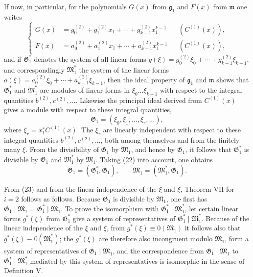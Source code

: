 \documentclass[11pt]{article}
\providecommand{\Gmod}{\mathfrak G}
\providecommand{\Mmod}{\mathfrak M}
\providecommand{\mideal}{\mathfrak m}
\providecommand{\gideal}{\mathfrak g}
\begin{document}
If now, in particular, for the polynomials $G(x)$ from $\gideal_1$ and $F(x)$ from $\mideal$ one writes
\begin{equation}
 \left\{\begin{aligned}
 G(x)&=g^{(2)}_0+g^{(2)}_1x_1+\cdots+g^{(2)}_{k-1}x_1^{k-1} &&(C^{(1)}(x)),\\
 F(x)&=a^{(2)}_0+a^{(2)}_1x_1+\cdots+a^{(2)}_{k-1}x_1^{k-1} &&(C^{(1)}(x)),
 \end{aligned}\right.
\tag{22}
\end{equation}
and if $\Gmod^*_1$ denotes the system of all linear forms $g(\xi)=g^{(2)}_0\xi_0+\cdots+g^{(2)}_{k-1}\xi_{k-1}$, and correspondingly $\Mmod^*_1$ the system of the linear forms $a(\xi)=a^{(2)}_0\xi_0+\cdots+a^{(2)}_{k-1}\xi_{k-1}$, then the ideal property of $\gideal_1$ and $\mideal$ shows that $\Gmod^*_1$ and $\Mmod^*_1$ are modules of linear forms in $\xi_0\ldots\xi_{k-1}$ with respect to the integral quantities $b^{(2)},c^{(2)},\ldots$. Likewise the principal ideal derived from $C^{(1)}(x)$ gives a module with respect to these integral quantities,
\[
 \Gmod_1=(\xi_0,\xi_1,\ldots,\xi_r,\ldots),
\]
where $\xi_r=x_1^rC^{(1)}(x)$. The $\xi_r$ are linearly independent with respect to these integral quantities $b^{(2)},c^{(2)},\ldots$, both among themselves and from the finitely many $\xi$. From the divisibility of $\Gmod_1$ by $\Mmod_1$, and hence by $\Gmod_1$, it follows that $\Gmod^*_1$ is divisible by $\Gmod_1$ and $\Mmod^*_1$ by $\Mmod_1$. Taking (22) into account, one obtains
\begin{equation}
 \Gmod_1=(\Gmod^*_1,\Gmod_1),\qquad
 \Mmod_1=(\Mmod^*_1,\Gmod_1).
\tag{23}
\end{equation}

From (23) and from the linear independence of the $\xi$ and $\xi$, Theorem VII for $i=2$ follows as follows. Because $\Gmod_1$ is divisible by $\Mmod_1$, one first has $\Gmod_1\mid\Mmod_1=\Gmod^*_1\mid\Mmod_1$. To prove the isomorphism with $\Gmod^*_1\mid\Mmod^*_1$, let certain linear forms $g^*(\xi)$ from $\Gmod^*_1$ give a system of representatives of $\Gmod^*_1\mid\Mmod^*_1$. Because of the linear independence of the $\xi$ and $\xi$, from $g^*(\xi)\equiv0(\Mmod_1)$ it follows also that $g^*(\xi)\equiv0(\Mmod^*_1)$; the $g^*(\xi)$ are therefore also incongruent modulo $\Mmod_1$, form a system of representatives of $\Gmod_1\mid\Mmod_1$, and the correspondence from $\Gmod_1\mid\Mmod_1$ to $\Gmod^*_1\mid\Mmod^*_1$ mediated by this system of representatives is isomorphic in the sense of Definition V.
\end{document}

